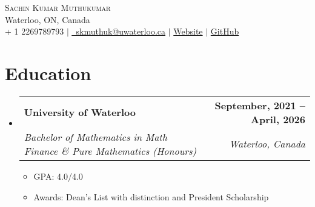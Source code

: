 \documentclass[letterpaper,11pt]{article}
\makeatletter
\newcommand{\resumeItem}[1]{
  \item\small{
    {#1 \vspace{-2pt}}
  }
}
\newcommand{\resumeSubheading}[4]{
  \vspace{-2pt}\item
    \begin{tabular*}{1.0\textwidth}[t]{l@{\extracolsep{\fill}}r}
      \textbf{#1} & \textbf{\small #2} \\
      \textit{\small#3} & \textit{\small #4} \\
    \end{tabular*}\vspace{-7pt}
}
\newcommand{\resumeSubHeadingListStart}{\begin{itemize}[leftmargin=0.0in, label={}]}
\newcommand{\resumeSubHeadingListEnd}{\end{itemize}}
\newcommand{\resumeItemListStart}{\begin{itemize}}
\newcommand{\resumeItemListEnd}{\end{itemize}\vspace{-5pt}}
\makeatother
\begin{document}

\begin{center}
    {\Huge \scshape Sachin Kumar Muthukumar} \\ \vspace{1pt}
    Waterloo, ON, Canada \\ \vspace{1pt}
    \small \raisebox{-0.1\height}{\faPhone}+ 1 2269789793 $|$
    \href{mailto:skmuthuk@uwaterloo.ca}{\underline{\faEnvelope \ skmuthuk@uwaterloo.ca}} $|$ 
    \href{https://sachink003.github.io/}{\underline{\faGlobe} Website} $|$
    \href{https://github.com/Sachink003}{\underline{\faGithub} GitHub}
    \vspace{-8pt}

\end{center}


\section{Education}
  \resumeSubHeadingListStart
    \resumeSubheading
      {University of Waterloo}{September, 2021 -- April, 2026}
      {Bachelor of Mathematics in Math Finance \& Pure Mathematics (Honours)}{Waterloo, Canada}
      \resumeItemListStart
        \resumeItem{GPA: 4.0/4.0}
        \resumeItem{Awards: Dean's List with distinction and President Scholarship}
      \resumeItemListEnd
    \resumeSubHeadingListEnd

\end{document}
